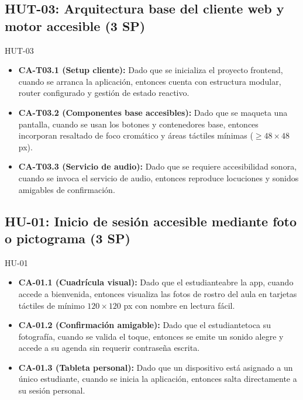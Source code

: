\documentclass[11pt,a4paper]{article}
\newcommand{\ca}[2]{\item \textbf{#1:} #2}
\begin{document}
\subsection{HUT-03: Arquitectura base del cliente web y motor accesible (3 SP)}
\begin{criterios}{HUT-03}
\begin{itemize}
\ca{CA-T03.1 (Setup cliente)}{Dado que se inicializa el proyecto frontend, cuando se arranca la aplicación, entonces cuenta con estructura modular, router configurado y gestión de estado reactivo.}
\ca{CA-T03.2 (Componentes base accesibles)}{Dado que se maqueta una pantalla, cuando se usan los botones y contenedores base, entonces incorporan resaltado de foco cromático y áreas táctiles mínimas ($\geq 48 \times 48$ px).}
\ca{CA-T03.3 (Servicio de audio)}{Dado que se requiere accesibilidad sonora, cuando se invoca el servicio de audio, entonces reproduce locuciones y sonidos amigables de confirmación.}
\end{itemize}
\end{criterios}

\subsection{HU-01: Inicio de sesión accesible mediante foto o pictograma (3 SP)}
\begin{criterios}{HU-01}
\begin{itemize}
\ca{CA-01.1 (Cuadrícula visual)}{Dado que el estudianteabre la app, cuando accede a bienvenida, entonces visualiza las fotos de rostro del aula en tarjetas táctiles de mínimo $120 \times 120$ px con nombre en lectura fácil.}
\ca{CA-01.2 (Confirmación amigable)}{Dado que el estudiantetoca su fotografía, cuando se valida el toque, entonces se emite un sonido alegre y accede a su agenda sin requerir contraseña escrita.}
\ca{CA-01.3 (Tableta personal)}{Dado que un dispositivo está asignado a un único estudiante, cuando se inicia la aplicación, entonces salta directamente a su sesión personal.}
\end{itemize}
\end{criterios}
\end{document}
